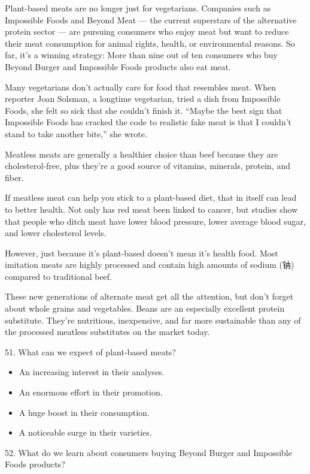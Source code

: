 \documentclass[UTF8,11pt]{ctexart}
\begin{document}
Plant-based meats are no longer just for vegetarians. Companies such as Impossible Foods and Beyond Meat — the current superstars of the alternative protein sector — are pursuing consumers who enjoy meat but want to reduce their meat consumption for animal rights, health, or environmental reasons. So far, it’s a winning strategy: More than nine out of ten consumers who buy Beyond Burger and Impossible Foods products also eat meat.


Many vegetarians don’t actually care for food that resembles meat. When reporter Joan Solsman, a longtime vegetarian, tried a dish from Impossible Foods, she felt so sick that she couldn’t finish it. “Maybe the best sign that Impossible Foods has cracked the code to realistic fake meat is that I couldn’t stand to take another bite,” she wrote.


Meatless meats are generally a healthier choice than beef because they are cholesterol-free, plus they’re a good source of vitamins, minerals, protein, and fiber.


If meatless meat can help you stick to a plant-based diet, that in itself can lead to better health. Not only has red meat been linked to cancer, but studies show that people who ditch meat have lower blood pressure, lower average blood sugar, and lower cholesterol levels.


However, just because it’s plant-based doesn’t mean it’s health food. Most imitation meats are highly processed and contain high amounts of sodium (钠) compared to traditional beef.


These new generations of alternate meat get all the attention, but don’t forget about whole grains and vegetables. Beans are an especially excellent protein substitute. They’re nutritious, inexpensive, and far more sustainable than any of the processed meatless substitutes on the market today.


51. What can we expect of plant-based meats?


\begin{itemize}[leftmargin=2em,itemsep=.2em,topsep=.4em]\item[A.] An increasing interest in their analyses.
\item[B.] An enormous effort in their promotion.
\item[C.] A huge boost in their consumption.
\item[D.] A noticeable surge in their varieties.
\end{itemize}

52. What do we learn about consumers buying Beyond Burger and Impossible Foods products?
\end{document}
